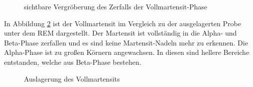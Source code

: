 \documentclass[a4paper, 11pt]{tubsreprt}
\begin{document}
\begin{figure}
\caption{sichtbare Vergröberung des Zerfalls der Vollmartensit-Phase}
\label{vergleich vollmartensit und auslagerung}
\end{figure}
In Abbildung \ref{Auslagerung des Vollmartensits} ist der Vollmartensit im Vergleich zu der ausgelagerten Probe unter dem REM dargestellt. Der Martensit ist vollständig in die Alpha- und Beta-Phase zerfallen und es sind keine Martensit-Nadeln mehr zu erkennen. Die Alpha-Phase ist zu großen Körnern angewachsen. In diesen sind hellere Bereiche entstanden, welche aus Beta-Phase bestehen.

\begin{figure}
\caption{Auslagerung des Vollmartensits}
\label{Auslagerung des Vollmartensits}
\end{figure}
\end{document}
